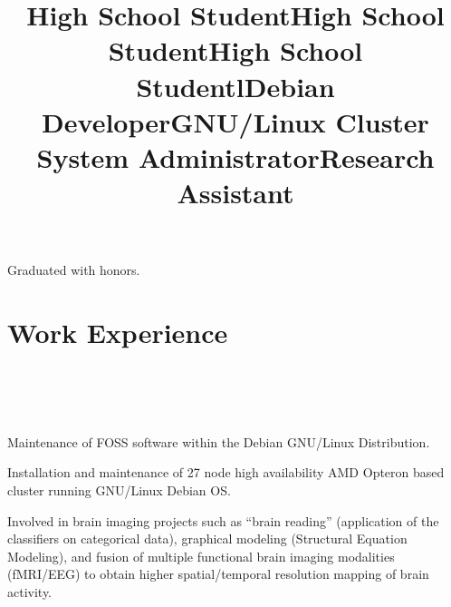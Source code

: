 \documentclass[10pt,overlapped,line]{res}
\begin{document}
\begin{resume}
 \title{High School Student}
 \begin{position}
  Graduated with honors.
 \end{position}

 \title{High School Student}
 \begin{position}
 \end{position}

 \title{High School Student}
 \begin{position}
 \end{position}

 \section{Work Experience}
 \begin{format}
   \title{l}\\
   \\
   \body\\
 \end{format}

 \title{Debian Developer}
 \location{}
 \begin{position}
   Maintenance of FOSS software within the Debian GNU/Linux Distribution.
 \end{position}

 \title{GNU/Linux Cluster System Administrator}
 \begin{position}
   Installation and maintenance of 27 node high availability {AMD}
   {O}pteron based cluster running GNU/Linux Debian OS.
 \end{position}

 \title{Research Assistant}
 \begin{position}
   Involved in brain imaging projects such as ``brain reading''
   (application of the classifiers on categorical data), graphical
   modeling (Structural Equation Modeling), and fusion of multiple
   functional brain imaging modalities (f{MRI}/{EEG}) to obtain higher
   spatial/temporal resolution mapping of brain activity.
 \end{position}


\end{resume}
\end{document}
